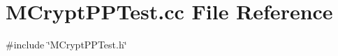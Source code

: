 \section{M\+Crypt\+P\+P\+Test.\+cc File Reference}
\label{MCryptPPTest_8cc}
{\ttfamily \#include \char`\"{}M\+Crypt\+P\+P\+Test.\+h\char`\"{}}\newline
